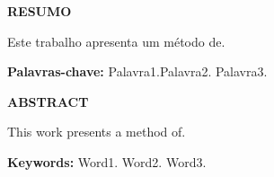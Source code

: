 \thispagestyle{plain}

\medskip

\begin{center}
  \textbf{RESUMO}
\end{center}



\bigskip

Este trabalho apresenta um método de.

\textbf{Palavras-chave:} Palavra1.Palavra2. Palavra3. 

\cleardoublepageempty

\thispagestyle{plain}

\begin{center}
	\textbf{ABSTRACT}
\end{center}

\bigskip

This work presents a method of.

\textbf{Keywords:} Word1. Word2. Word3.